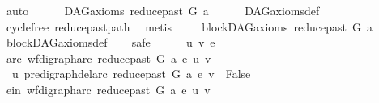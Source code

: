 \begin{isabellebody}
\ auto\ \ \isanewline
{}\isamarkupfalse%
\isanewline
\ \ \isamarkupfalse%
\ {\isachardoublequoteopen}DAG{\isacharunderscore}{\kern0pt}axioms\ {\isacharparenleft}{\kern0pt}reduce{\isacharunderscore}{\kern0pt}past\ G\ a{\isacharparenright}{\kern0pt}{\isachardoublequoteclose}\isanewline
\ \ \ \ \isamarkupfalse%
\ DAG{\isacharunderscore}{\kern0pt}axioms{\isacharunderscore}{\kern0pt}def\isanewline
\ \ \ \ \isamarkupfalse%
\ cycle{\isacharunderscore}{\kern0pt}free\ reduce{\isacharunderscore}{\kern0pt}past{\isacharunderscore}{\kern0pt}path\ \isamarkupfalse%
\ metis\ \isanewline
{}\isamarkupfalse%
\isanewline
\ \ \isamarkupfalse%
\ {\isachardoublequoteopen}blockDAG{\isacharunderscore}{\kern0pt}axioms\ {\isacharparenleft}{\kern0pt}reduce{\isacharunderscore}{\kern0pt}past\ G\ a{\isacharparenright}{\kern0pt}{\isachardoublequoteclose}\isanewline
\ \ \ \ \isamarkupfalse%
\ blockDAG{\isacharunderscore}{\kern0pt}axioms{\isacharunderscore}{\kern0pt}def\isanewline
\ \ \isamarkupfalse%
\ safe\isanewline
\ \ \ \ \isamarkupfalse%
\ u\ v\ e\ \isanewline
\ \ \ \ \isamarkupfalse%
\ arc{\isacharcolon}{\kern0pt}\ {\isachardoublequoteopen}wf{\isacharunderscore}{\kern0pt}digraph{\isachardot}{\kern0pt}arc\ {\isacharparenleft}{\kern0pt}reduce{\isacharunderscore}{\kern0pt}past\ G\ a{\isacharparenright}{\kern0pt}\ e\ {\isacharparenleft}{\kern0pt}u{\isacharcomma}{\kern0pt}\ v{\isacharparenright}{\kern0pt}{\isachardoublequoteclose}\isanewline
\ \ \ \ \isamarkupfalse%
\ \isamarkupfalse%
\ {\isachardoublequoteopen}\ u\ {\isasymrightarrow}\isactrlsup {\isacharplus}{\kern0pt}\isactrlbsub pre{\isacharunderscore}{\kern0pt}digraph{\isachardot}{\kern0pt}del{\isacharunderscore}{\kern0pt}arc\ {\isacharparenleft}{\kern0pt}reduce{\isacharunderscore}{\kern0pt}past\ G\ a{\isacharparenright}{\kern0pt}\ e\isactrlesub \ v\ {\isasymLongrightarrow}\ False\ {\isachardoublequoteclose}\isanewline
\ \ \ \ \isamarkupfalse%
\ {\isacharminus}{\kern0pt}\isanewline
\ \ \ \ \ \ \isamarkupfalse%
\ e{\isacharunderscore}{\kern0pt}in{\isacharcolon}{\kern0pt}\ {\isachardoublequoteopen}{\isacharparenleft}{\kern0pt}wf{\isacharunderscore}{\kern0pt}digraph{\isachardot}{\kern0pt}arc\ {\isacharparenleft}{\kern0pt}reduce{\isacharunderscore}{\kern0pt}past\ G\ a{\isacharparenright}{\kern0pt}\ e\ {\isacharparenleft}{\kern0pt}u{\isacharcomma}{\kern0pt}\ v{\isacharparenright}{\kern0pt}{\isacharparenright}{\kern0pt}{\isachardoublequoteclose}\ \isanewline

\end{isabellebody}
